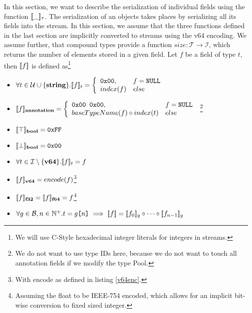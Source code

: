 In this section, we want to describe the serialization of individual fields using the function $[\![\_]\!]_\tau$. The serialization of an objects takes places by serializing all its fields into the stream. In this section, we assume that the three functions defined in the last section are implicitly converted to streams using the v64 encoding. We assume further, that compound types provide a function $size: \mathcal{T} → \mathcal{I}$, which returns the number of elements stored in a given field.
Let $f$ be a field of type $t$, then $[\![f]\!]$ is defined as\footnote{We will use C-Style hexadecimal integer literals for integers in streams.}
\begin{itemize}
 \item $\forall t \in \mathcal{U}\cup\{\textbf{string}\}. [\![f]\!]_t = \left\{ 
   \begin{array}{l l}
     \texttt{0x00}, & f = \texttt{NULL}\\
     index(f) & else
   \end{array} \right.$
 
 \item $[\![f]\!]_{\textbf{annotation}} = \left\{ 
   \begin{array}{l l}
     \texttt{0x00 0x00}, & f = \texttt{NULL}\\
     baseTypeName(f) \circ index(t) & else
   \end{array} \right.$
   \footnote{We do not want to use type IDs here, because we do not want to touch all annotation fields if we modify the type Pool.}
 
 \item $[\![\top]\!]_\textbf{bool} = \texttt{0xFF}$
 \item $[\![\bot]\!]_\textbf{bool} = \texttt{0x00}$
 
 \item $\forall t \in \mathcal{I}\setminus\{\textbf{v64}\}. [\![f]\!]_t = f$
 
 \item $[\![f]\!]_\textbf{v64} = encode(f)$\footnote{With encode as defined in listing \ref{v64enc}.}
 
 \item $[\![f]\!]_\textbf{f32} = [\![f]\!]_\textbf{f64} = f$\footnote{Assuming the float to be IEEE-754 encoded, which allows for an implicit bit-wise conversion to fixed sized integer.}
 
 \item $\forall g \in \mathcal{B}, n \in \mathbb{N}^+. t = g\texttt{[}n\texttt{]} \implies [\![f]\!] = [\![f_0]\!]_g \circ \cdots \circ [\![f_{n-1}]\!]_g$
 

\end{itemize}
